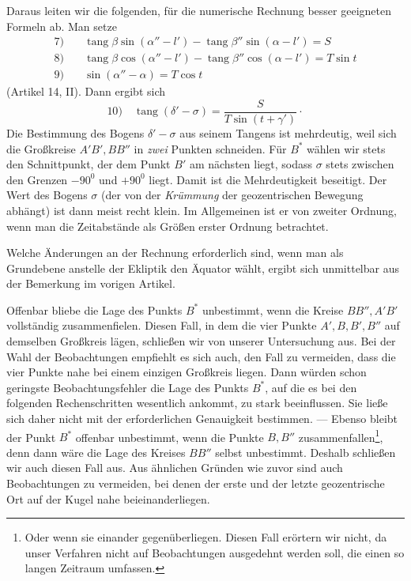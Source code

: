 Daraus leiten wir die folgenden, für die numerische Rechnung besser geeigneten Formeln ab. Man
setze
\[
\begin{aligned}
7)\quad&\operatorname{tang}\beta\sin(\alpha''-l')-\operatorname{tang}\beta''\sin(\alpha-l')=S\\[.5ex]
8)\quad&\operatorname{tang}\beta\cos(\alpha''-l')-\operatorname{tang}\beta''\cos(\alpha-l')=T\sin t\\[.5ex]
9)\quad&\sin(\alpha''-\alpha)=T\cos t
\end{aligned}
\]
(Artikel 14, II). Dann ergibt sich
\[
10)\quad\operatorname{tang}(\delta'-\sigma)=\frac{S}{T\sin(t+\gamma')}\mathpunct{\cdot}
\]
Die Bestimmung des Bogens $\delta'-\sigma$ aus seinem Tangens ist mehrdeutig, weil sich die Großkreise
$A'B',BB''$ in \emph{zwei} Punkten schneiden. Für $B^*$ wählen wir stets den \hypertarget{native-186}{}Schnittpunkt, der
dem Punkt $B'$ am nächsten liegt, sodass $\sigma$ stets zwischen den Grenzen $-90^0$ und $+90^0$
liegt. Damit ist die Mehrdeutigkeit beseitigt. Der Wert des Bogens $\sigma$ (der von der
\emph{Krümmung} der geozentrischen Bewegung abhängt) ist dann meist recht klein. Im Allgemeinen
ist er von zweiter Ordnung, wenn man die Zeitabstände als Größen erster Ordnung betrachtet.

Welche Änderungen an der Rechnung erforderlich sind, wenn man als Grundebene anstelle der
Ekliptik den Äquator wählt, ergibt sich unmittelbar aus der Bemerkung im vorigen Artikel.

Offenbar bliebe die Lage des Punkts $B^*$ unbestimmt, wenn die Kreise $BB'',A'B'$ vollständig
zusammenfielen. Diesen Fall, in dem die vier Punkte $A',B,B',B''$ auf demselben Großkreis lägen,
schließen wir von unserer Untersuchung aus. Bei der Wahl der Beobachtungen empfiehlt es sich
auch, den Fall zu vermeiden, dass die vier Punkte nahe bei einem einzigen Großkreis liegen. Dann
würden schon geringste Beobachtungsfehler die Lage des Punkts $B^*$, auf die es bei den
folgenden Rechenschritten wesentlich ankommt, zu stark beeinflussen. Sie ließe sich daher nicht
mit der erforderlichen Genauigkeit bestimmen. --- Ebenso bleibt der Punkt $B^*$ offenbar
unbestimmt, wenn die Punkte $B,B''$ zusammenfallen\footnote{Oder wenn sie einander
gegenüberliegen. Diesen Fall erörtern wir nicht, da unser Verfahren nicht auf Beobachtungen
ausgedehnt werden soll, die einen so langen Zeitraum umfassen.}, denn dann wäre die Lage des
Kreises $BB''$ selbst unbestimmt. Deshalb schließen wir auch diesen Fall aus. Aus ähnlichen
Gründen wie zuvor sind auch Beobachtungen zu vermeiden, bei denen der erste und der letzte
geozentrische Ort auf der Kugel nahe beieinanderliegen.
